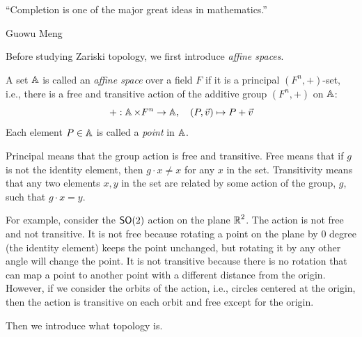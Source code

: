 \epigraph{``Completion is one of the major great ideas in mathematics.''}{Guowu Meng}

Before studying Zariski topology, we first introduce \emph{affine spaces}.

\begin{definition*}
  A set $\operatorname{\mathbb{A}}$ is called an \emph{affine space} over a field $F$ if it is a principal $(F^n, +)$-set, i.e., there is a free and transitive action of the additive group $(F^n, +)$ on $\operatorname{\mathbb{A}}$:
  \[
    + : \operatorname{\mathbb{A}} \times F^n \to \operatorname{\mathbb{A}}, \quad (P, \vec{v}) \mapsto P + \vec{v}
  \]
  Each element $P \in \operatorname{\mathbb{A}}$ is called a \emph{point} in $\operatorname{\mathbb{A}}$.
\end{definition*}

Principal means that the group action is free and transitive. Free means that if $g$ is not the identity element, then $g \cdot x \neq x$ for any $x$ in the set. Transitivity means that any two elements $x, y$ in the set are related by some action of the group, $g$, such that $g \cdot x = y$.

For example, consider the $\operatorname{\text{\normalfont\sffamily SO}}(2)$ action on the plane $\operatorname{\mathbb{R}}^2$. The action is not free and not transitive. It is not free because rotating a point on the plane by $0$ degree (the identity element) keeps the point unchanged, but rotating it by any other angle will change the point. It is not transitive because there is no rotation that can map a point to another point with a different distance from the origin. However, if we consider the orbits of the action, i.e., circles centered at the origin, then the action is transitive on each orbit and free except for the origin.

Then we introduce what topology is.

